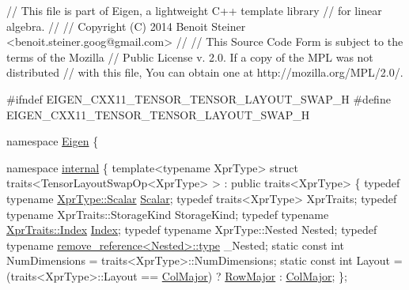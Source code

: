 \begin{DoxyCodeInclude}
\textcolor{comment}{// This file is part of Eigen, a lightweight C++ template library}
\textcolor{comment}{// for linear algebra.}
\textcolor{comment}{//}
\textcolor{comment}{// Copyright (C) 2014 Benoit Steiner <benoit.steiner.goog@gmail.com>}
\textcolor{comment}{//}
\textcolor{comment}{// This Source Code Form is subject to the terms of the Mozilla}
\textcolor{comment}{// Public License v. 2.0. If a copy of the MPL was not distributed}
\textcolor{comment}{// with this file, You can obtain one at http://mozilla.org/MPL/2.0/.}

\textcolor{preprocessor}{#ifndef EIGEN\_CXX11\_TENSOR\_TENSOR\_LAYOUT\_SWAP\_H}
\textcolor{preprocessor}{#define EIGEN\_CXX11\_TENSOR\_TENSOR\_LAYOUT\_SWAP\_H}

\textcolor{keyword}{namespace }\hyperlink{namespace_eigen}{Eigen} \{

\textcolor{keyword}{namespace }\hyperlink{namespaceinternal}{internal} \{
\textcolor{keyword}{template}<\textcolor{keyword}{typename} XprType>
\textcolor{keyword}{struct }traits<TensorLayoutSwapOp<XprType> > : \textcolor{keyword}{public} traits<XprType>
\{
  \textcolor{keyword}{typedef} \textcolor{keyword}{typename} \hyperlink{eigen_2bench_2bench__gemm_8cpp_a052eb942d12b6404aade6fae4b075fb9}{XprType::Scalar} \hyperlink{eigen_2bench_2bench__gemm_8cpp_a052eb942d12b6404aade6fae4b075fb9}{Scalar};
  \textcolor{keyword}{typedef} traits<XprType> XprTraits;
  \textcolor{keyword}{typedef} \textcolor{keyword}{typename} XprTraits::StorageKind StorageKind;
  \textcolor{keyword}{typedef} \textcolor{keyword}{typename} \hyperlink{namespace_eigen_a62e77e0933482dafde8fe197d9a2cfde}{XprTraits::Index} \hyperlink{namespace_eigen_a62e77e0933482dafde8fe197d9a2cfde}{Index};
  \textcolor{keyword}{typedef} \textcolor{keyword}{typename} XprType::Nested Nested;
  \textcolor{keyword}{typedef} \textcolor{keyword}{typename} \hyperlink{struct_eigen_1_1internal_1_1remove__reference_a48fc595958f2006d8ddea90f18833ae0}{remove\_reference<Nested>::type} \_Nested;
  \textcolor{keyword}{static} \textcolor{keyword}{const} \textcolor{keywordtype}{int} NumDimensions = traits<XprType>::NumDimensions;
  \textcolor{keyword}{static} \textcolor{keyword}{const} \textcolor{keywordtype}{int} Layout = (traits<XprType>::Layout == \hyperlink{group__enums_ggaacded1a18ae58b0f554751f6cdf9eb13a0cbd4bdd0abcfc0224c5fcb5e4f6669a}{ColMajor}) ? 
      \hyperlink{group__enums_ggaacded1a18ae58b0f554751f6cdf9eb13acfcde9cd8677c5f7caf6bd603666aae3}{RowMajor} : \hyperlink{group__enums_ggaacded1a18ae58b0f554751f6cdf9eb13a0cbd4bdd0abcfc0224c5fcb5e4f6669a}{ColMajor};
\};


\end{DoxyCodeInclude}
